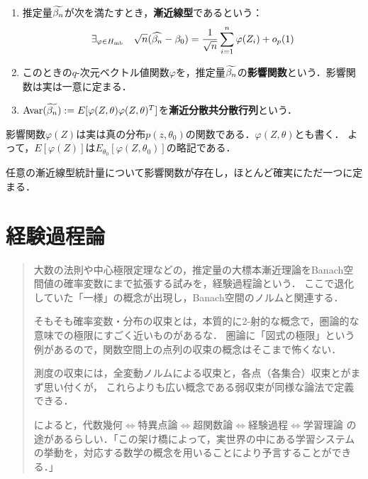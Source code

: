 \documentclass[uplatex,dvipdfmx]{jsreport}
\begin{document}
\begin{definition}\mbox{}
    \begin{enumerate}
        \item 推定量$\widetilde{\beta_n}$が次を満たすとき，\textbf{漸近線型}であるという：
        \[\exists_{\varphi\in H_{\mathrm{mb}}}\quad\sqrt{n}(\widehat{\beta_n}-\beta_0)=\frac{1}{\sqrt{n}}\sum^n_{i=1}\varphi(Z_i)+o_p(1)\]
        \item このときの$q$-次元ベクトル値関数$\varphi$を，推定量$\widetilde{\beta_n}$の\textbf{影響関数}という．影響関数は実は一意に定まる．
        \item $\mathrm{Avar}(\widetilde{\beta_n}):=E[\varphi(Z,\theta)\varphi(Z,\theta)^T]$を\textbf{漸近分散共分散行列}という．
    \end{enumerate}
\end{definition}
\begin{remark}
    影響関数$\varphi(Z)$は実は真の分布$p(z,\theta_0)$の関数である．$\varphi(Z,\theta)$とも書く．
    よって，$E[\varphi(Z)]$は$E_{\theta_0}[\varphi(Z,\theta_0)]$の略記である．
\end{remark}

\begin{theorem}
    任意の漸近線型統計量について影響関数が存在し，ほとんど確実にただ一つに定まる．
\end{theorem}

\chapter{経験過程論}

\begin{quotation}
    大数の法則や中心極限定理などの，推定量の大標本漸近理論をBanach空間値の確率変数にまで拡張する試みを，経験過程論という．
    ここで退化していた「一様」の概念が出現し，Banach空間のノルムと関連する．

    そもそも確率変数・分布の収束とは，本質的に2-射的な概念で，圏論的な意味での極限にすごく近いものがあるな．
    圏論に「図式の極限」という例があるので，関数空間上の点列の収束の概念はそこまで怖くない．

    測度の収束には，全変動ノルムによる収束と，各点（各集合）収束とがまず思い付くが，
    これらよりも広い概念である弱収束が同様な論法で定義できる．

    \cite{渡辺澄夫}によると，代数幾何$\Leftrightarrow$特異点論$\Leftrightarrow$超関数論$\Leftrightarrow$経験過程$\Leftrightarrow$学習理論
    の途があるらしい．「この架け橋によって，実世界の中にある学習システムの挙動を，対応する数学の概念を用いることにより予言することができる．」
\end{quotation}
\end{document}
